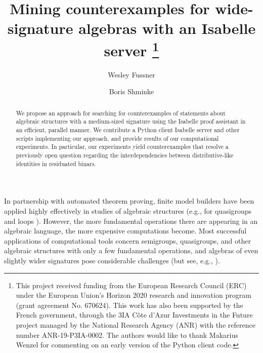 \documentclass{easychair}
\title{Mining counterexamples for wide-signature algebras with an Isabelle server
  \thanks{This project received funding from the European Research Council (ERC) under the European Union’s Horizon 2020 research and innovation program (grant agreement No. 670624). This work has also been supported by the French government, through the 3IA Côte d’Azur Investments in the Future project managed by the National Research Agency (ANR) with the reference number ANR-19-P3IA-0002. The authors would like to thank Makarius Wenzel for commenting on an early version of the Python client code.}}
\author{Wesley Fussner\inst{1} \and
Boris Shminke\inst{1}
}
\institute{Laboratoire J.A. Dieudonn\'e, CNRS, and Universit\'e C\^ote d'Azur, France\\
\email{wfussner@unice.fr}\\
\email{Boris.SHMINKE@univ-cotedazur.fr}}
\begin{document}
\maketitle
\begin{abstract}
We propose an approach for searching for counterexamples of statements about algebraic structures with a medium-sized signature using the Isabelle proof assistant in an efficient, parallel manner. We contribute a Python client Isabelle server and other scripts implementing our approach, and provide results of our computational experiments. In particular, our experiments yield counterexamples that resolve a previously open question regarding the interdependencies between distributive-like identities in residuated binars.
\end{abstract}
In partnership with automated theorem proving, finite model builders have been applied highly effectively in studies of algebraic structures (e.g., for quasigroups and loops \cite{phillips2010automated}). However, the more fundamental operations there are appearing in an algebraic language, the more expensive computations become. Most successful applications of computational tools concern semigroups, quasigroups, and other algebraic structures with only a few fundamental operations, and algebras of even slightly wider signatures pose considerable challenges (but see, e.g., \cite{SV2008,JK2019}).
\end{document}
